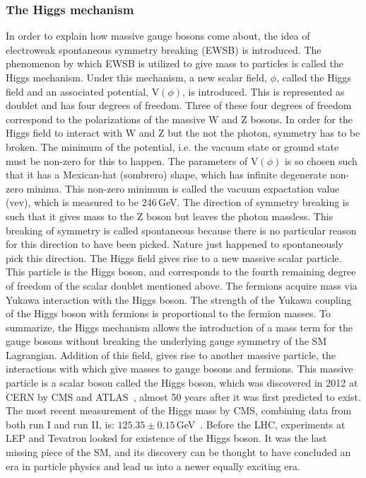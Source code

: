 \subsubsection{The Higgs mechanism}
In order to explain how massive gauge bosons come about, the idea of electroweak spontaneous symmetry breaking (EWSB) is introduced. The phenomenon by which EWSB is utilized to give mass to particles is called the Higgs mechanism. Under this mechanism, a new scalar field, $\phi$, called the Higgs field and an associated potential, V$(\phi)$, is introduced. This is represented as doublet and has four degrees of freedom. Three of these four degrees of freedom correspond to the polarizations of the massive W and Z bosons. In order for the Higgs field to interact with W and Z but the not the photon, symmetry has to be broken. The minimum of the potential, i.e. the vacuum state or ground state must be non-zero for this to happen. The parameters of V$(\phi)$ is so chosen such that it has a Mexican-hat (sombrero) shape, which has infinite degenerate non-zero minima. This non-zero minimum is called the vacuum expactation value (vev), which is measured to be 246\,GeV. The direction of symmetry breaking is such that it gives mass to the Z boson but leaves the photon massless. This breaking of symmetry is called spontaneous because there is no particular reason for this direction to have been picked. Nature just happened to spontaneously pick this direction. The Higgs field gives rise to a new massive scalar particle. This particle is the Higgs boson, and corresponds to the fourth remaining degree of freedom of the scalar doublet mentioned above. The fermions acquire mass via Yukawa interaction with the Higgs boson. The strength of the Yukawa coupling of the Higgs boson with fermions is proportional to the fermion masses. To summarize, the Higgs mechanism allows the introduction of a mass term for the gauge bosons without breaking the underlying gauge symmetry of the SM Lagrangian. Addition of this field, gives rise to another massive particle, the interactions with which give masses to gauge bosons and fermions. This massive particle is a scalar boson called the Higgs boson, which was discovered in 2012 at CERN by CMS and ATLAS~\cite{Aad:2012tfa, Chatrchyan:2012ufa, Chatrchyan:2013lba}, almost 50 years after it was first predicted to exist. The most recent measurement of the Higgs mass by CMS, combining data from both run I and run II, is: $125.35\pm0.15$\,GeV~\cite{HIG-19-004}. Before the LHC, experiments at LEP and Tevatron looked for existence of the Higgs boson. It was the last missing piece of the SM, and its discovery can be thought to have concluded an era in particle physics and lead us into a newer equally exciting era.


